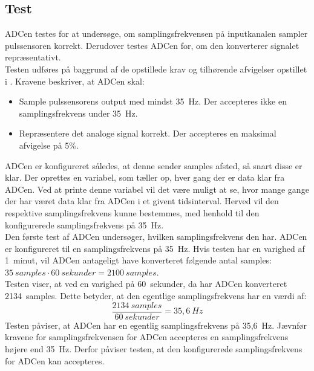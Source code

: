 \subsection{Test}
ADCen testes for at undersøge, om samplingsfrekvensen på inputkanalen sampler pulssensoren korrekt. Derudover testes ADCen for, om den konverterer signalet repræsentativt. \\
Testen udføres på baggrund af de opstillede krav og tilhørende afvigelser opstillet i . Kravene beskriver, at ADCen skal:
\begin{itemize}
	\item Sample pulssensorens output med mindst 35~Hz. Der accepteres ikke en samplingsfrekvens under 35~Hz. 
	\item Repræsentere det analoge signal korrekt. Der accepteres en maksimal afvigelse på 5\%. 
\end{itemize}
ADCen er konfigureret således, at denne sender samples afsted, så snart disse er klar. Der oprettes en variabel, som tæller op, hver gang der er data klar fra ADCen. Ved at printe denne variabel vil det være muligt at se, hvor mange gange der har været data klar fra ADCen i et givent tidsinterval. Herved vil den respektive samplingsfrekvens kunne bestemmes, med henhold til den konfigurerede samplingsfrekvens på 35~Hz. \\
Den første test af ADCen undersøger, hvilken samplingsfrekvens den har. ADCen er konfigureret til en samplingsfrekvens på 35~Hz. Hvis testen har en varighed af 1~minut, vil ADCen antageligt have konverteret følgende antal samples: $35~samples \cdot 60~sekunder = 2100~samples$. \\
Testen viser, at ved en varighed på 60~sekunder, da har ADCen konverteret 2134~samples. Dette betyder, at den egentlige samplingsfrekvens har en værdi af:
\begin{equation}
\frac{2134~samples}{60~sekunder} = 35,6~Hz 
\end{equation}
Testen påviser, at ADCen har en egentlig samplingsfrekvens på 35,6~Hz. Jævnfør kravene for samplingsfrekvensen for ADCen accepteres en samplingsfrekvens højere end 35~Hz. Derfor påviser testen, at den konfigurerede samplingsfrekvens for ADCen kan accepteres. 

